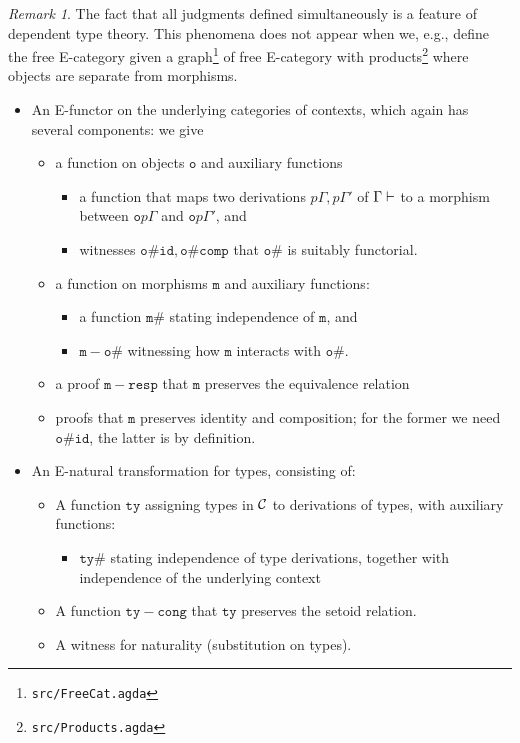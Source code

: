 \documentclass{amsart}
\theoremstyle{plain}
\theoremstyle{definition}
\theoremstyle{remark}
\newtheorem{remark}[theorem]{Remark}
\begin{document}
\begin{remark}
  The fact that all judgments defined simultaneously is a feature of
  dependent type theory.  This phenomena does not appear when we,
  e.g., define the free E-category given a
  graph\footnote{\texttt{src/FreeCat.agda}} of free E-category with
  products\footnote{\texttt{src/Products.agda}} where objects are
  separate from morphisms.
\end{remark}

\begin{itemize}
\item An E-functor on the underlying categories of contexts, which
  again has several components: we give
  \begin{itemize}
  \item a function on objects $\mathtt{o}$ and auxiliary functions
    \begin{itemize}
    \item a function that maps two derivations $p\Gamma, p\Gamma'$ of
      $\Gamma \vdash$ to a morphism between $\mathtt{o} p\Gamma$ and
      $\mathtt{o} p\Gamma'$, and
    \item witnesses $\mathtt{o\# id}, \mathtt{o\# comp}$ that
      $\mathtt{o\#}$ is suitably functorial.
    \end{itemize}


  \item a function on morphisms $\mathtt{m}$ and auxiliary functions:
    \begin{itemize}
    \item a function $\mathtt{m\#}$ stating independence of
      $\mathtt{m}$, and
    \item $\mathtt{m-o\#}$ witnessing how $\mathtt{m}$ interacts with
    $\mathtt{o\#}$.
    \end{itemize}
  \item a proof $\mathtt{m-resp}$ that $\mathtt{m}$ preserves the
    equivalence relation
  \item proofs that $\mathtt{m}$ preserves identity and composition;
    for the former we need $\mathtt{o\# id}$, the latter is by
    definition.
  \end{itemize}
\item An E-natural transformation for types, consisting of:
  \begin{itemize}
  \item A function $\mathtt{ty}$ assigning types in $\mathcal{C}$ to
    derivations of types, with auxiliary functions:
    \begin{itemize}
    \item $\mathtt{ty\#}$ stating independence of type derivations,
      together with independence of the underlying context
    \end{itemize}
  \item A function $\mathtt{ty-cong}$ that $\mathtt{ty}$ preserves the
    setoid relation.
  \item A witness for naturality (substitution on types).
  \end{itemize}


\end{itemize}
\end{document}
